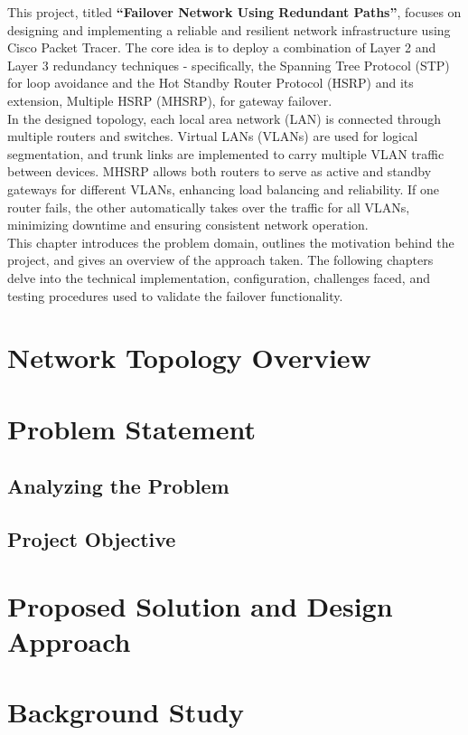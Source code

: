 \documentclass[12pt]{report}
\begin{document}
This project, titled \textbf{“Failover Network Using Redundant Paths”}, focuses on designing and implementing a reliable and resilient network infrastructure using Cisco Packet Tracer. The core idea is to deploy a combination of Layer 2 and Layer 3 redundancy techniques - specifically, the Spanning Tree Protocol (STP) for loop avoidance and the Hot Standby Router Protocol (HSRP) and its extension, Multiple HSRP (MHSRP), for gateway failover.\\

In the designed topology, each local area network (LAN) is connected through multiple routers and switches. Virtual LANs (VLANs) are used for logical segmentation, and trunk links are implemented to carry multiple VLAN traffic between devices. MHSRP allows both routers to serve as active and standby gateways for different VLANs, enhancing load balancing and reliability. If one router fails, the other automatically takes over the traffic for all VLANs, minimizing downtime and ensuring consistent network operation.\\

This chapter introduces the problem domain, outlines the motivation behind the project, and gives an overview of the approach taken. The following chapters delve into the technical implementation, configuration, challenges faced, and testing procedures used to validate the failover functionality.

\newpage

\chapter{Network Topology Overview}
\chapter{Problem Statement}
\section{Analyzing the Problem}
\section{Project Objective}
\chapter{Proposed Solution and Design Approach}
\chapter{Background Study}
\end{document}
